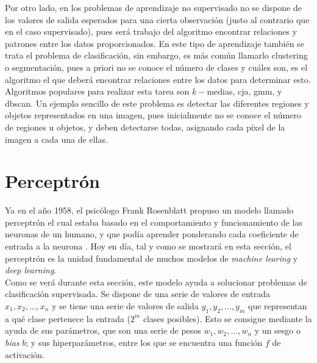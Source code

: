 		Por otro lado, en los problemas de aprendizaje no supervisado no se dispone de los valores de salida esperados para una cierta observación (justo al contrario que en el caso supervisado), pues será trabajo del algoritmo encontrar relaciones y patrones entre los datos proporcionados. En este tipo de aprendizaje también se trata el problema de clasificación, sin embargo, es más común llamarlo clustering o segmentación, pues a priori no se conoce el número de clases y cuáles son, es el algoritmo el que deberá encontrar relaciones entre los datos para determinar esto. Algoritmos populares para realizar esta tarea son $k-$medias, \gls{cja}, \gls{gmm}, y \gls{dbscan}. Un ejemplo sencillo de este problema es detectar las diferentes regiones y objetos representados en una imagen, pues inicialmente no se conoce el número de regiones u objetos, y deben detectarse todas, asignando cada píxel de la imagen a cada una de ellas. 

	\section{Perceptrón}
	
		Ya en el año 1958, el psicólogo Frank Rosenblatt propuso un modelo llamado perceptrón el cual estaba basado en el comportamiento y funcionamiento de las neuronas de un humano, y que podía aprender ponderando cada coeficiente de entrada a la neurona \cite{historiaIA}. Hoy en día, tal y como se mostrará en esta sección, el perceptrón es la unidad fundamental de muchos modelos de \textit{machine learing} y \textit{deep learning}. \\
		
		Como se verá durante esta sección, este modelo ayuda a solucionar problemas de clasificación supervisada. Se dispone de una serie de valores de entrada $x_1, x_2, \hdots, x_n$ y se tiene una serie de valores de salida $y_1, y_2, \hdots, y_m$ que representan a qué clase pertenece la entrada ($2^m$ clases posibles). Esto se consigue mediante la ayuda de sus parámetros, que son una serie de pesos $w_1, w_2, \hdots, w_n$ y un sesgo o \textit{bias} $b$; y sus hiperparámetros, entre los que se encuentra una función $f$ de activación. \\
		
